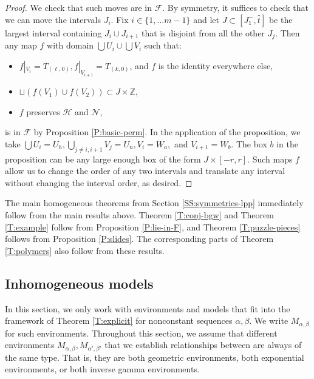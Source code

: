\documentclass[aop, preprint]{imsart}
\theoremstyle{plain}
\theoremstyle{definition}
\theoremstyle{plain}
\newcommand{\sset}{\subset}
\newcommand{\al}{\alpha}
\newcommand{\be}{\beta}
\newcommand{\scrH}{\mathcal{H}}
\newcommand{\scrN}{\mathcal{N}}
\newcommand{\scrF}{\mathcal{F}}
\newcommand{\Z}{\mathds{Z}}
\newcommand{\X}{\times}
\begin{document}
\begin{proof}
	We check that such moves are in $\scrF$. By symmetry, it suffices to check that we can move the intervals $J_i$. Fix $i \in \{1, \dots m-1\}$ and let $J \sset [J_1^-, \hat t]$ be the largest interval containing $J_i \cup J_{i+1}$ that is disjoint from all the other $J_j$.
	Then any map $f$ with domain $\bigcup U_i \cup \bigcup V_i$ such that:
	\begin{itemize}[nosep]
		\item $f|_{V_i} = T_{(\ell, 0)}, f|_{V_{i+1}} = T_{(k, 0)}$, and $f$ is the identity everywhere else,
		\item $\sqcup (f(V_1) \cup f(V_2)) \sset J \X \Z$,
		\item $f$ preserves $\scrH$ and $\scrN$,
	\end{itemize}
	is in $\scrF$ by Proposition \ref{P:basic-perm}. In the application of the proposition, we take $\bigcup U_i = U_h, \bigcup_{j \ne i, i+1} V_j = U_n, V_i = W_a,$ and $V_{i+1} = W_b$. The box $b$ in the proposition can be any large enough box of the form $J \X [-r, r]$. Such maps $f$ allow us to change the order of any two intervals and translate any interval without changing the interval order, as desired.
\end{proof}

The main homogeneous theorems from Section \ref{SS:symmetries-lpp} immediately follow from the main results above. Theorem \ref{T:conj-bgw} and Theorem \ref{T:example} follow from Proposition \ref{P:lie-in-F}, and Theorem \ref{T:puzzle-pieces} follows from Proposition \ref{P:slides}. The corresponding parts of Theorem \ref{T:polymers} also follow from these results.


\subsection{Inhomogeneous models}
\label{SS:inhomog}

In this section, we only work with environments and models that fit into the framework of Theorem \ref{T:explicit} for nonconstant sequences $\al, \be$. We write $M_{\al, \be}$ for such environments. Throughout this section, we assume that different environments $M_{\al, \be}, M_{\al', \be'}$ that we establish relationships between are always of the same type. That is, they are both geometric environments, both exponential environments, or both inverse gamma environments.
\end{document}
